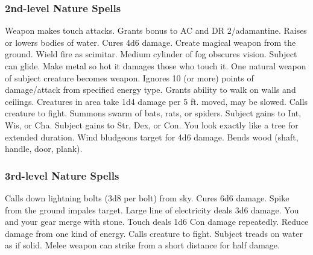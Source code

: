 \subsubsection{2nd-level Nature Spells}
\begin{spelllist}
   Weapon makes touch attacks. 
   Grants  bonus to AC and DR 2/adamantine.
   Raises or lowers bodies of water.
   Cures 4d6 damage.
   Create magical weapon from the ground.
   Wield fire as scimitar.
   Medium cylinder of fog obscures vision.
   Subject can glide.
   Make metal so hot it damages those who touch it.
   One natural weapon of subject creature becomes  weapon.
   Ignores 10 (or more) points of damage/attack from specified energy type.
   Grants ability to walk on walls and ceilings.
   Creatures in area take 1d4 damage per 5 ft. moved, may be slowed.
   Calls creature to fight.
   Summons swarm of bats, rats, or spiders.
   Subject gains  to Int, Wis, or Cha.
   Subject gains  to Str, Dex, or Con.
   You look exactly like a tree for extended duration.
   Wind bludgeons target for 4d6 damage.
   Bends wood (shaft, handle, door, plank).
\end{spelllist}

\subsubsection{3rd-level Nature Spells}
\begin{spelllist}
   Calls down lightning bolts (3d8 per bolt) from sky.
   Cures 6d6 damage.
   Spike from the ground impales target.
   Large line of electricity deals 3d6 damage.
   You and your gear merge with stone.
   Touch deals 1d6 Con damage repeatedly.
   Reduce damage from one kind of energy.
   Calls creature to fight.
   Subject treads on water as if solid.
   Melee weapon can strike from a short distance for half damage.
\end{spelllist}

